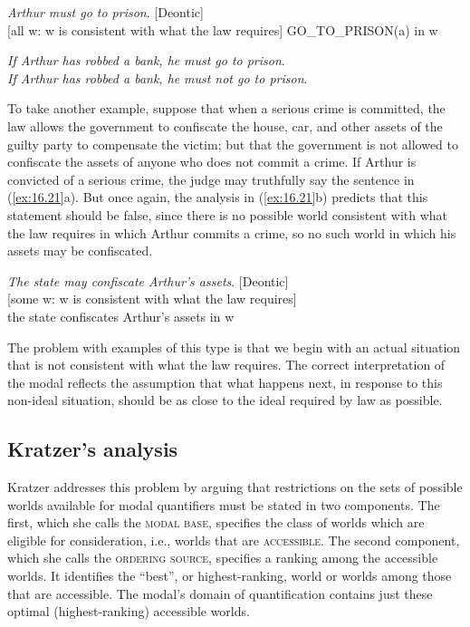 \ea \label{ex:16.19}
\ea  \textit{Arthur must go to prison}.  [Deontic]\\
\ex{} [all w: w is consistent with what the law requires] GO\_TO\_PRISON(a) in w
                       \z
\z

\ea \label{ex:16.20}
\ea  \textit{If Arthur has robbed a bank, he} \textit{must go to prison}.\\
\ex \textit{If Arthur has robbed a bank, he} \textit{must not go to prison}.
                       \z
\z


To take another example, suppose that when a serious crime is committed, the law allows the government to confiscate the house, car, and other assets of the guilty party to compensate the victim; but that the government is not allowed to confiscate the assets of anyone who does not commit a crime. If Arthur is convicted of a serious crime, the judge may truthfully say the sentence in (\ref{ex:16.21}a). But once again, the analysis in (\ref{ex:16.21}b) predicts that this statement should be false, since there is no possible world consistent with what the law requires in which Arthur commits a crime, so no such world in which his assets may be confiscated.


\ea \label{ex:16.21}
\ea  \textit{The state may confiscate Arthur’s assets}.  [Deontic]\\
\ex{} [some w: w is consistent with what the law requires]\\
  the state confiscates Arthur’s assets in w
\z
\z


The problem with examples of this type is that we begin with an actual situation that is not consistent with what the law requires. The correct interpretation of the modal reflects the assumption that what happens next, in response to this non-ideal situation, should be as close to the ideal required by law as possible.


\subsection{Kratzer’s analysis}\label{sec:16.3.2}

Kratzer addresses this problem by arguing that restrictions on the sets of possible worlds available for modal quantifiers must be stated in two components. The first, which she calls the \textsc{modal base}, specifies the class of worlds which are eligible for consideration, i.e., worlds that are \textsc{accessible}. The second component, which she calls the \textsc{ordering source}, specifies a ranking among the accessible worlds. It identifies the “best”, or highest-ranking, world or worlds among those that are accessible. The modal’s domain of quantification contains just these optimal (highest-ranking) accessible worlds.



